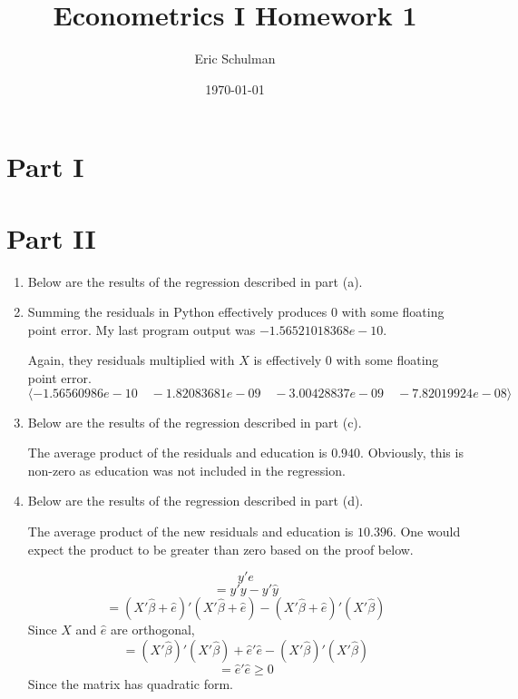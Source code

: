 \documentclass{article}
\title{Econometrics I Homework 1}
\author{Eric Schulman}
\date{\today}
\begin{document}
\maketitle

\section{Part I}

\section{Part II}

\begin{enumerate}[label=\alph*)]

\item Below are the results of the regression described in part (a).



\item Summing the residuals in Python effectively produces 0 with some floating point error. My last program output was $-1.56521018368e-10.
$

Again, they residuals multiplied with $X$ is effectively $0$ with some floating point error. $\langle -1.56560986e-10 \quad -1.82083681e-09 \quad -3.00428837e-09 \quad -7.82019924e-08 \rangle$

\item 

Below are the results of the regression described in part (c).



The average product of the residuals and education is $0.940$. Obviously, this is non-zero as education was not included in the regression.


\item

Below are the results of the regression described in part (d).



The average product of the new residuals and education is $10.396$. One would expect the product to be greater than zero based on the proof below.


$$y'e$$
$$= y'y - y'\hat{y}$$
$$= (X'\hat{\beta} + \hat{e})'(X'\hat{\beta} + \hat{e}) - (X'\hat{\beta} + \hat{e})'(X'\hat{\beta}) $$
Since $X$ and $\hat{e}$ are orthogonal,
$$= (X'\hat{\beta})'(X'\hat{\beta}) + \hat{e}' \hat{e} - (X'\hat{\beta})'(X'\hat{\beta}) $$
$$ = \hat{e}'\hat{e} \geq 0$$
Since the matrix has quadratic form.


\end{enumerate}
\end{document}
